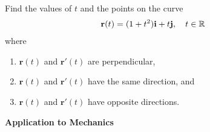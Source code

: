 \item 
Find the values of $t$ and the points on the curve 
\begin{align*}
  \mathbf{r}(t) &= (1+t^2) \mathbf{i} + t\mathbf{j}, \quad t\in \mathbb{R}
\end{align*}
where
\begin{enumerate}
  \item $\mathbf{r}(t)$ and $\mathbf{r}'(t)$ are perpendicular,
  \item $\mathbf{r}(t)$ and $\mathbf{r}'(t)$ have the same direction, and
  \item $\mathbf{r}(t)$ and $\mathbf{r}'(t)$ have opposite directions.   
\end{enumerate}
%
%
%
%
%
\item \textbf{Application to Mechanics}\\
